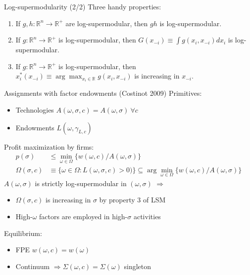 \documentclass[10pt,notes=hide]{beamer}
\begin{document}
\begin{frame}{Log-supermodularity (2/2)}
Three handy properties:
\begin{enumerate}
\item If $g,h:\mathbb{R}^n\to\mathbb{R}^{+}$ are log-supermodular, then $gh$ is log-supermodular.
\item If $g:\mathbb{R}^n\to\mathbb{R}^{+}$ is log-supermodular, then $G(x_{-i})\equiv \int g(x_i,x_{-i})dx_i$ is log-supermodular.
\item If $g:\mathbb{R}^n\to\mathbb{R}^{+}$ is log-supermodular, then $x_i^* (x_{-i}) \equiv \arg\max_{x_i\in\mathbb{R}} g(x_i,x_{-i})$ is increasing in $x_{-i}$.
\end{enumerate}
\end{frame}
\begin{frame}{Assignments with factor endowments (Costinot 2009)}
Primitives: 
\begin{itemize}
	\item Technologies $A(\omega,\sigma,c) = A(\omega,\sigma) \ \forall c$
	\item Endowments $L(\omega,\gamma_{L,c})$
\end{itemize}
Profit maximization by firms:
\begin{align*}
p(\sigma) &\leq \min_{\omega\in\Omega} \{w(\omega,c) / A(\omega,\sigma) \} \\
\Omega(\sigma,c) &\equiv \{\omega\in\Omega:L(\omega,\sigma,c)>0)\} \subseteq \arg\min_{\omega\in\Omega} \{w(\omega,c) / A(\omega,\sigma) \} 
\end{align*}
$A(\omega,\sigma)$ is strictly log-supermodular in $(\omega,\sigma)$ $\Rightarrow$
\begin{itemize}
	\item $\Omega(\sigma,c)$ is increasing in $\sigma$ by property 3 of LSM\\
	\item High-$\omega$ factors are employed in high-$\sigma$ activities\\
\end{itemize}
Equilibrium: 
\begin{itemize}
	\item FPE $w(\omega,c)=w(\omega)$
	\item Continuum $\Rightarrow \Sigma(\omega,c) = \Sigma(\omega)$ singleton 
\end{itemize}
\end{frame}
\end{document}
